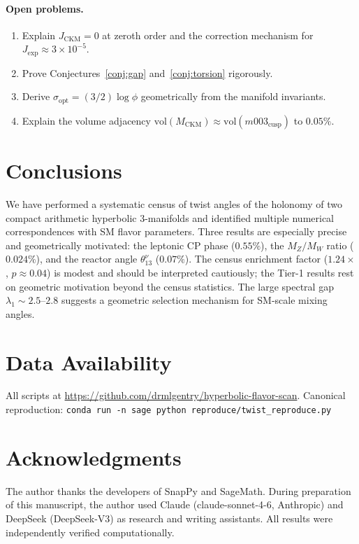 \documentclass[11pt,a4paper]{article}
\theoremstyle{definition}
\theoremstyle{remark}
\newcommand{\MCKM}{M_{\mathrm{CKM}}}
\begin{document}
\paragraph{Open problems.}
\begin{enumerate}[(1)]
\item Explain $J_\mathrm{CKM} = 0$ at zeroth order and the
  correction mechanism for $J_\mathrm{exp} \approx 3\times10^{-5}$.
\item Prove Conjectures~\ref{conj:gap} and~\ref{conj:torsion}
  rigorously.
\item Derive $\sigma_\mathrm{opt} = (3/2)\log\phi$ geometrically
  from the manifold invariants.
\item Explain the volume adjacency $\mathrm{vol}(\MCKM) \approx
  \mathrm{vol}(m003_\mathrm{cusp})$ to $0.05\%$.
\end{enumerate}

\section{Conclusions}
\label{sec:conclusions}

We have performed a systematic census of twist angles of the holonomy
of two compact arithmetic hyperbolic 3-manifolds and identified
multiple numerical correspondences with SM flavor parameters.
Three results are especially precise and geometrically motivated:
the leptonic CP phase ($0.55\%$), the $M_Z/M_W$ ratio ($0.024\%$),
and the reactor angle $\theta_{13}^\nu$ ($0.07\%$).
The census enrichment factor ($1.24\times$, $p\approx0.04$) is modest
and should be interpreted cautiously; the Tier-1 results rest on
geometric motivation beyond the census statistics.
The large spectral gap $\lambda_1 \sim 2.5$--$2.8$ suggests a
geometric selection mechanism for SM-scale mixing angles.

\section*{Data Availability}
All scripts at \url{https://github.com/drmlgentry/hyperbolic-flavor-scan}.
Canonical reproduction:
\texttt{conda run -n sage python reproduce/twist\_reproduce.py}

\section*{Acknowledgments}
The author thanks the developers of SnapPy and SageMath.
During preparation of this manuscript, the author used Claude
(claude-sonnet-4-6, Anthropic) and DeepSeek (DeepSeek-V3) as
research and writing assistants.
All results were independently verified computationally.
\end{document}
